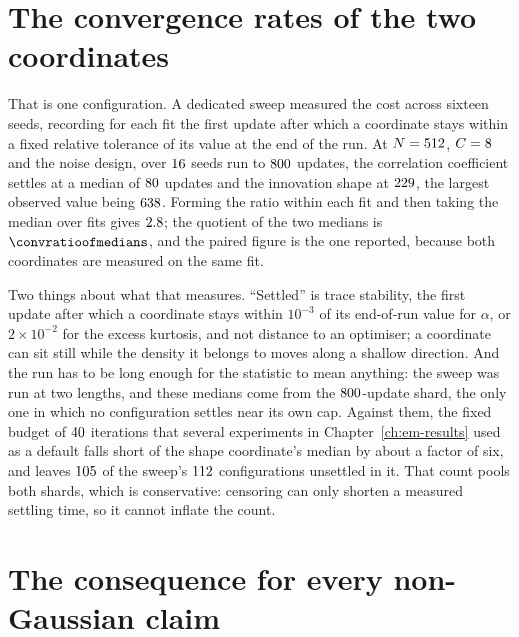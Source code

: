 \section{The convergence rates of the two coordinates}
\label{sec:em-two-rates}

That is one configuration. A dedicated sweep measured the cost across sixteen
seeds, recording for each fit the first update after which a coordinate stays
within a fixed relative tolerance of its value at the end of the run. At
$N = 512$, $C = 8$ and the \convdesign{} noise design, over
$16$ seeds run to $800$ updates, the correlation coefficient
settles at a median of $80$ updates and the innovation shape at
$229$, the largest observed value being $638$. Forming the
ratio within each fit and then taking the median over fits gives $2.8$;
the quotient of the two medians is $\convratioofmedians$, and the paired figure
is the one reported, because both coordinates are measured on the same fit.

Two things about what that measures. ``Settled'' is trace stability, the
first update after which a coordinate stays within $10^{-3}$ of its end-of-run
value for $\alpha$, or $2\times10^{-2}$ for the excess kurtosis, and not
distance to an optimiser; a coordinate can sit still while the density it
belongs to moves along a shallow direction. And the run has to be long enough
for the statistic to mean anything: the sweep was run at two lengths, and these
medians come from the $800$-update shard, the only one in which no
configuration settles near its own cap. Against them, the fixed budget of
$40$ iterations that several experiments in
Chapter~\ref{ch:em-results} used as a default
falls short of the shape coordinate's median by about a factor of six, and
leaves $105$ of the sweep's $112$ configurations
unsettled in it. That count pools both shards, which is conservative:
censoring can only shorten a measured settling time, so it cannot inflate
the count.

\section{The consequence for every non-Gaussian claim}
\label{sec:em-stopping}

